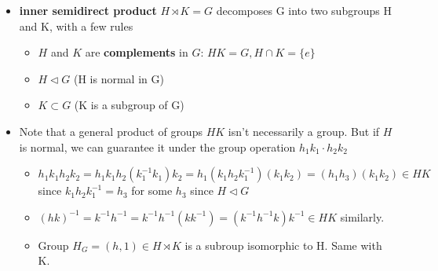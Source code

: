 \documentclass[11pt, oneside]{article}   	%
\begin{document}
\begin{itemize}
 \item \textbf{inner semidirect product} $H \rtimes K = G$ decomposes G into two subgroups H and K, with a few rules
   \begin{itemize}
   \item $H$ and $K$ are \textbf{complements} in $G$: $HK = G, H \cap K = \{e\}$
   \item $H \triangleleft G$ (H is normal in G)
   \item $K \subset G$ (K is a subgroup of G)
   \end{itemize}
 \item Note that a general product of groups $HK$ isn't necessarily a group.  But if $H$ is normal, we can guarantee it under the group operation $h_1k_1 \cdot h_2k_2$
 \begin{itemize}
 \item $h_1k_1h_2k_2 = h_1k_1h_2(k_1^{-1}k_1)k_2 = h_1(k_1h_2k_1^{-1})(k_1k_2) = (h_1h_3)(k_1k_2) \in HK$ since $k_1h_2k_1^{-1} = h_3$ for some $h_3$ since $H \triangleleft G$
 \item $(hk)^{-1} = k^{-1}h^{-1}= k^{-1}h^{-1}(kk^{-1}) = (k^{-1}h^{-1}k)k^{-1} \in HK$ similarly.
 \item Group $H_G = (h,1) \in H \rtimes K$ is a subroup isomorphic to H.  Same with K.
 

\end{itemize}
\end{itemize}
\end{document}
